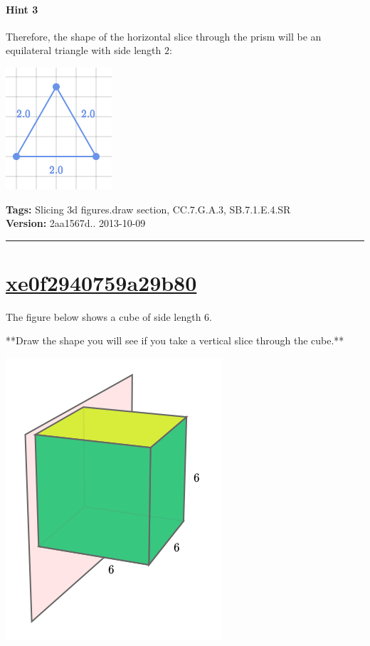 \documentclass[twocolumn,10pt]{article}
\def\shrinkfactor{0.4}
\begin{document}
\paragraph{Hint 3}Therefore, the shape of the horizontal slice through the prism will be an equilateral triangle with side length $2$:  

\includegraphics[scale=\shrinkfactor]{figures/f8d6ecceeaa6abcdead884e4f8edd48e735a5e80.png}



\medskip
\noindent
\textbf{Tags:} {\footnotesize Slicing 3d figures.draw section, CC.7.G.A.3, SB.7.1.E.4.SR}\\
\textbf{Version:} 2aa1567d.. 2013-10-09
\smallskip\hrule





\section{\href{https://www.khanacademy.org/devadmin/content/items/xe0f2940759a29b80}{xe0f2940759a29b80}}

\noindent
The figure below shows a cube of side length $6$.  

**Draw the shape you will see if you take a vertical slice through the cube.**   \DIFaddbegin {}\DIFaddend 


\includegraphics[scale=\shrinkfactor]{figures/294f9514eb8ff76c2ef01fa15cac104d58e65bc8.png}
\end{document}
